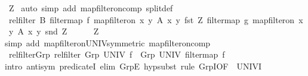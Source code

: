 \begin{isabellebody}
\ Z\ \isamarkupfalse%
{\isacharparenleft}{\kern0pt}auto\ simp\ add{\isacharcolon}{\kern0pt}\ map{\isacharunderscore}{\kern0pt}filter{\isacharunderscore}{\kern0pt}on{\isacharunderscore}{\kern0pt}comp\ split{\isacharunderscore}{\kern0pt}def{\isacharparenright}{\kern0pt}\isanewline
\ \ \isamarkupfalse%
\isanewline
\ \ \isamarkupfalse%
\ {\isachardoublequoteopen}rel{\isacharunderscore}{\kern0pt}filter\ B\ {\isacharparenleft}{\kern0pt}filtermap\ f\ {\isacharparenleft}{\kern0pt}map{\isacharunderscore}{\kern0pt}filter{\isacharunderscore}{\kern0pt}on\ {\isacharbraceleft}{\kern0pt}{\isacharparenleft}{\kern0pt}x{\isacharcomma}{\kern0pt}\ y{\isacharparenright}{\kern0pt}{\isachardot}{\kern0pt}\ A\ x\ y{\isacharbraceright}{\kern0pt}\ fst\ Z{\isacharparenright}{\kern0pt}{\isacharparenright}{\kern0pt}\ {\isacharparenleft}{\kern0pt}filtermap\ g\ {\isacharparenleft}{\kern0pt}map{\isacharunderscore}{\kern0pt}filter{\isacharunderscore}{\kern0pt}on\ {\isacharbraceleft}{\kern0pt}{\isacharparenleft}{\kern0pt}x{\isacharcomma}{\kern0pt}\ y{\isacharparenright}{\kern0pt}{\isachardot}{\kern0pt}\ A\ x\ y{\isacharbraceright}{\kern0pt}\ snd\ Z{\isacharparenright}{\kern0pt}{\isacharparenright}{\kern0pt}{\isachardoublequoteclose}\isanewline
\ \ \ \ \isamarkupfalse%
\ Z\ \isamarkupfalse%
{\isacharparenleft}{\kern0pt}simp\ add{\isacharcolon}{\kern0pt}\ map{\isacharunderscore}{\kern0pt}filter{\isacharunderscore}{\kern0pt}on{\isacharunderscore}{\kern0pt}UNIV{\isacharbrackleft}{\kern0pt}symmetric{\isacharbrackright}{\kern0pt}\ map{\isacharunderscore}{\kern0pt}filter{\isacharunderscore}{\kern0pt}on{\isacharunderscore}{\kern0pt}comp{\isacharparenright}{\kern0pt}\isanewline
{}\isamarkupfalse%
%
\endisatagproof
{\isafoldproof}%
%
\isadelimproof
\isanewline
%
\endisadelimproof
\isanewline
{}\isamarkupfalse%
\ rel{\isacharunderscore}{\kern0pt}filter{\isacharunderscore}{\kern0pt}Grp{\isacharcolon}{\kern0pt}\ {\isachardoublequoteopen}rel{\isacharunderscore}{\kern0pt}filter\ {\isacharparenleft}{\kern0pt}Grp\ UNIV\ f{\isacharparenright}{\kern0pt}\ {\isacharequal}{\kern0pt}\ Grp\ UNIV\ {\isacharparenleft}{\kern0pt}filtermap\ f{\isacharparenright}{\kern0pt}{\isachardoublequoteclose}\isanewline
%
\isadelimproof
%
\endisadelimproof
%
\isatagproof
{}\isamarkupfalse%
{\isacharparenleft}{\kern0pt}{\isacharparenleft}{\kern0pt}intro\ antisym\ predicate{}I{\isacharsemicolon}{\kern0pt}\ {\isacharparenleft}{\kern0pt}elim\ GrpE{\isacharsemicolon}{\kern0pt}\ hypsubst{\isacharparenright}{\kern0pt}{\isacharquery}{\kern0pt}{\isacharparenright}{\kern0pt}{\isacharcomma}{\kern0pt}\ rule\ GrpI{\isacharbrackleft}{\kern0pt}OF\ {\isacharunderscore}{\kern0pt}\ UNIV{\isacharunderscore}{\kern0pt}I{\isacharbrackright}{\kern0pt}{\isacharparenright}{\kern0pt}\isanewline

\end{isabellebody}
